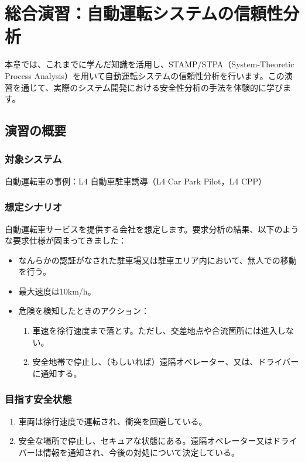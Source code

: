 \chapter{総合演習：自動運転システムの信頼性分析}
\label{chap6}

本章では、これまでに学んだ知識を活用し、STAMP/STPA（System-Theoretic Process Analysis）を用いて自動運転システムの信頼性分析を行います。この演習を通じて、実際のシステム開発における安全性分析の手法を体験的に学びます。

\section{演習の概要}

\subsection{対象システム}
自動運転車の事例：L4 自動車駐車誘導（L4 Car Park Pilot，L4 CPP）

\subsection{想定シナリオ}
自動運転車サービスを提供する会社を想定します。要求分析の結果、以下のような要求仕様が固まってきました：

\begin{itemize}
    \item なんらかの認証がなされた駐車場又は駐車エリア内において、無人での移動を行う。
    \item 最大速度は10km/h。
    \item 危険を検知したときのアクション：
    \begin{enumerate}
        \item 車速を徐行速度まで落とす。ただし、交差地点や合流箇所には進入しない。
        \item 安全地帯で停止し、（もしいれば）遠隔オペレーター、又は、ドライバーに通知する。
    \end{enumerate}
\end{itemize}

\subsection{目指す安全状態}
\begin{enumerate}
    \item 車両は徐行速度で運転され、衝突を回避している。
    \item 安全な場所で停止し、セキュアな状態にある。遠隔オペレーター又はドライバーは情報を通知され、今後の対処について決定している。
\end{enumerate}

